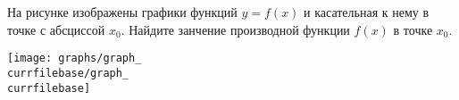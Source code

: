 \begin{ex}
	\begin{condition}
		\begin{minipage}[t]{0.67\textwidth}
			На рисунке изображены графики функций \( y=f(x) \) и касательная к нему в
			точке с абсциссой \( x_0 \). Найдите занчение производной функции \( f(x) \) в точке \( x_0 \).
		\end{minipage}
		\begin{minipage}[c]{0.25\textwidth}
			\texttt{[image: graphs/graph\_\\currfilebase/graph\_\\currfilebase]}
		\end{minipage}
	\end{condition}
\end{ex}